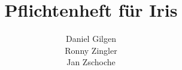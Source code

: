 \documentclass[a4paper, 12pt, oneside, draft]{article}
\begin{document}
  
 
\title{\textbf{Pflichtenheft für Iris}}
\author{Daniel Gilgen\\ Ronny Zingler \\ Jan Zschoche}
\maketitle
 
\newpage
\tableofcontents
\pagestyle{fancy}

\newpage




 
 
 



 
\listoffigures
 
\end{document}
